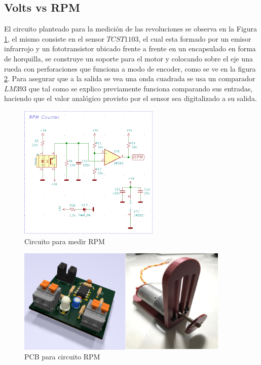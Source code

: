 \documentclass[11pt, a4paper]{article}
\begin{document}
\subsection{Volts vs RPM}
El circuito planteado para la medición de las revoluciones se observa en la Figura \ref{fig:circ_rpm}, el mismo consiste en el sensor $TCST1103$, el cual esta formado por un emisor infrarrojo y un fototransistor ubicado frente a frente en un encapsulado en forma de horquilla, se construye un soporte para el motor y colocando sobre el eje una rueda con perforaciones que funciona a modo de encoder, como se ve en la figura \ref{fig:pcb_rpm}. Para asegurar que a la salida se vea una onda cuadrada se usa un comparador $LM393$ que tal como se explico previamente funciona comparando sus entradas, haciendo que el valor analógico provisto por el sensor sea digitalizado a su salida. 
\begin{figure}[h!]
	\centering
	\includegraphics[width=0.6\textwidth]{Imagenes/circ_rpm.png}
	\caption{Circuito para medir RPM}
	\label{fig:circ_rpm}
\end{figure} 

\begin{figure}[h!]
	\centering
	\includegraphics[width=0.9\textwidth]{Imagenes/rpm_pcb.png}
	\caption{PCB para circuito RPM}
	\label{fig:pcb_rpm}
\end{figure} 
\end{document}

